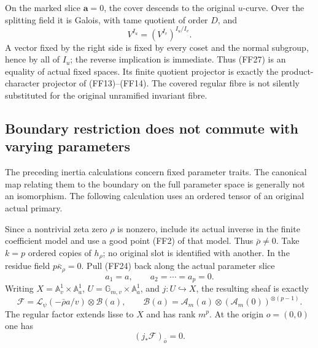 \documentclass[11pt,a4paper]{article}
\theoremstyle{definition}
\begin{document}
On the marked slice \(\boldsymbol a=0\), the cover descends to
the original \(u\)-curve.  Over the splitting field it is Galois,
with tame quotient of order \(D\), and
\[
 V^{I_u}=(V^{I_v})^{I_u/I_v}.                           \tag{FF27}
\]
A vector fixed by the right side is fixed by every coset and
the normal subgroup, hence by all of \(I_u\); the reverse implication
is immediate.  Thus (FF27) is an equality of actual fixed spaces.
Its finite quotient projector is exactly the product-character
projector of (FF13)--(FF14).  The covered regular fibre is not
silently substituted for the original unramified invariant fibre.

\subsection{Boundary restriction does not commute with varying parameters}

The preceding inertia calculations concern fixed parameter traits.
The canonical map relating them to the boundary on the full parameter
space is generally not an isomorphism.  The following calculation
uses an ordered tensor of an original actual primary.

Since a nontrivial zeta zero \(\rho\) is nonzero, include its actual
inverse in the finite coefficient model and use a good point (FF2)
of that model.  Thus \(\bar\rho\ne0\).  Take \(k=p\) ordered
copies of \(h_\rho\); no original slot is identified with another.
In the residue field \(p\bar\kappa_\rho=0\).  Pull (FF24) back
along the actual parameter slice
\[
       a_1=a,\qquad a_2=\cdots=a_p=0.                  \tag{FF28}
\]
Writing \(X=\mathbb A^1_v\times\mathbb A^1_a\),
\(U=\mathbb G_{m,v}\times\mathbb A^1_a\), and
\(j:U\hookrightarrow X\), the resulting sheaf is exactly
\[
 \mathcal F
   =\mathcal L_\psi(-\bar\rho a/v)\otimes\mathcal B(a),
 \qquad
 \mathcal B(a)=\mathcal A_m(a)\otimes
                         (\mathcal A_m(0))^{\otimes(p-1)}.
                                                               \tag{FF29}
\]
The regular factor extends lisse to \(X\) and has rank \(m^p\).
At the origin \(o=(0,0)\) one has
\[
                 (j_*\mathcal F)_{\bar o}=0.           \tag{FF30}
\]
\end{document}
